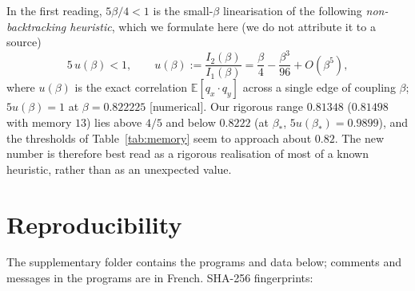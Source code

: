\documentclass[11pt,a4paper]{article}
\theoremstyle{plain}
\theoremstyle{remark}
\numberwithin{equation}{section}
\newcommand{\E}{\mathbb{E}}
\newcommand{\st}[1]{\textsf{[#1]}}
\begin{document}
In the first reading, $5\beta/4<1$ is the small-$\beta$ linearisation of the following \emph{non-backtracking heuristic}, which we
formulate here (we do not attribute it to a source)
\[
5\,u(\beta)<1,\qquad u(\beta):=\frac{I_2(\beta)}{I_1(\beta)}=\frac\beta4-\frac{\beta^3}{96}+O(\beta^5),
\]
where $u(\beta)$ is the exact correlation $\E[q_x\cdot q_y]$ across a single edge of coupling $\beta$; $5u(\beta)=1$ at
$\beta=0.822225$ \st{numerical}. Our rigorous range $0.81348$ ($0.81498$ with memory $13$) lies above $4/5$ and below $0.8222$
(at $\beta_*$, $5u(\beta_*)=0.9899$), and the thresholds of Table~\ref{tab:memory} seem to approach about $0.82$. The new number is
therefore best read as a rigorous realisation of most of a known heuristic, rather than as an unexpected value.

\section{Reproducibility}\label{sec:repro}
The supplementary folder contains the programs and data below; comments and messages in the programs are in French. SHA-256
fingerprints:
\end{document}

